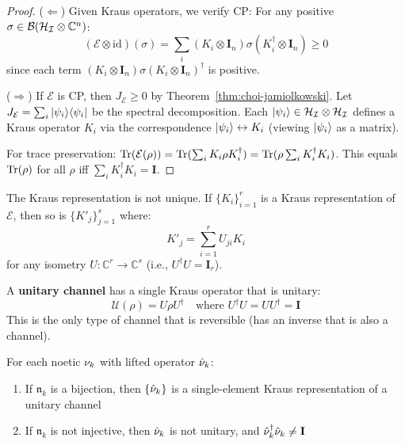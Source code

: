 \begin{proof}
($\Leftarrow$) Given Kraus operators, we verify CP: For any positive $\sigma \in \mathcal{B}(\mathcal{H}_{\mathcal{I}} \otimes \mathbb{C}^n)$:
\[
(\mathcal{E} \otimes \mathrm{id})(\sigma) = \sum_i (K_i \otimes \mathbf{I}_n) \sigma (K_i^\dagger \otimes \mathbf{I}_n) \geq 0
\]
since each term $(K_i \otimes \mathbf{I}_n) \sigma (K_i \otimes \mathbf{I}_n)^\dagger$ is positive.

($\Rightarrow$) If $\mathcal{E}$ is CP, then $J_{\mathcal{E}} \geq 0$ by Theorem~\ref{thm:choi-jamiolkowski}. Let $J_{\mathcal{E}} = \sum_i |\psi_i\rangle\langle \psi_i|$ be the spectral decomposition. Each $|\psi_i\rangle \in \mathcal{H}_{\mathcal{I}} \otimes \mathcal{H}_{\mathcal{I}}$ defines a Kraus operator $K_i$ via the correspondence $|\psi_i\rangle \leftrightarrow K_i$ (viewing $|\psi_i\rangle$ as a matrix).

For trace preservation: $\mathrm{Tr}(\mathcal{E}(\rho)) = \mathrm{Tr}(\sum_i K_i \rho K_i^\dagger) = \mathrm{Tr}(\rho \sum_i K_i^\dagger K_i)$. This equals $\mathrm{Tr}(\rho)$ for all $\rho$ iff $\sum_i K_i^\dagger K_i = \mathbf{I}$.
\end{proof}

\begin{remark}
\label{rem:kraus-nonunique}
The Kraus representation is not unique. If $\{K_i\}_{i=1}^{r}$ is a Kraus representation of $\mathcal{E}$, then so is $\{K'_j\}_{j=1}^{s}$ where:
\[
K'_j = \sum_{i=1}^{r} U_{ji} K_i
\]
for any isometry $U : \mathbb{C}^r \to \mathbb{C}^s$ (i.e., $U^\dagger U = \mathbf{I}_r$).
\end{remark}

\begin{definition}
\label{def:unitary-channel}
A \textbf{unitary channel} has a single Kraus operator that is unitary:
\[
\mathcal{U}(\rho) = U \rho U^\dagger \quad \text{where } U^\dagger U = U U^\dagger = \mathbf{I}
\]
This is the only type of channel that is reversible (has an inverse that is also a channel).
\end{definition}

\begin{proposition}
\label{prop:noetic-kraus}
For each noetic $\nu_{k}$ with lifted operator $\hat{\nu}_k$:
\begin{enumerate}
  \item If $\mathfrak{n}_k$ is a bijection, then $\{\hat{\nu}_k\}$ is a single-element Kraus representation of a unitary channel
  \item If $\mathfrak{n}_k$ is not injective, then $\hat{\nu}_k$ is not unitary, and $\hat{\nu}_k^\dagger \hat{\nu}_k \neq \mathbf{I}$
\end{enumerate}
\end{proposition}

